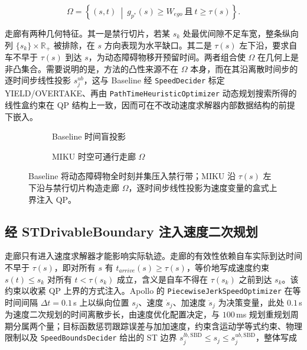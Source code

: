 \documentclass[a4paper,11pt]{ctexart}
\theoremstyle{definition}
\begin{document}
\begin{equation}
    \Omega = \left\{ (s,t) \ \middle|\ g_{p^{*}}(s) \geq W_{ego}\ \text{且}\ t \geq \tau(s) \right\}.
    \label{eq:st_corridor}
\end{equation}

走廊有两种几何特征。其一是禁行切片，若某 $s_k$ 处最优间隙不足车宽，整条纵向列 $\{s_k\}\times\mathbb{R}_{+}$ 被排除，在 $s$ 方向表现为水平缺口。其二是 $\tau(s)$ 左下沿，要求自车不早于 $\tau(s)$ 到达 $s$，为动态障碍物移开预留时间。两者组合使 $\Omega$ 在几何上是非凸集合。需要说明的是，方法的凸性来源不在 $\Omega$ 本身，而在其沿离散时间步的逐时间步线性投影 $s_j^{ub}$，这与 Baseline 经 \texttt{SpeedDecider} 标定 YIELD/OVERTAKE、再由 \texttt{PathTimeHeuristicOptimizer} 动态规划搜索所得的线性盒约束在 QP 结构上一致，因而可在不改动速度求解器内部数据结构的前提下嵌入。

\begin{figure}[htbp]
\centering
\begin{subfigure}[b]{0.46\textwidth}
  \centering
  \caption{Baseline 时间盲投影}
\end{subfigure}\hfill
\begin{subfigure}[b]{0.46\textwidth}
  \centering
  \caption{MIKU 时空可通行走廊 $\Omega$}
\end{subfigure}
\caption{ST 平面上的时空可通行走廊与上界收紧}
\caption*{Baseline 将动态障碍物全时刻并集压入禁行带；MIKU 沿 $\tau(s)$ 左下沿与禁行切片构造走廊 $\Omega$，逐时间步线性投影为速度变量的盒式上界注入 QP。}
\label{fig:corridor}
\end{figure}

\subsection{经 STDrivableBoundary 注入速度二次规划}
\label{sec:method_inject}

走廊只有进入速度求解器才能影响实际轨迹。走廊的有效性依赖自车实际到达时间不早于 $\tau(s)$，即对所有 $s$ 有 $t_{arrive}(s)\geq\tau(s)$，等价地写成速度约束 $s(t)\leq s_k$ 对所有 $t<\tau(s_k)$ 成立，含义是自车不得在 $\tau(s_k)$ 之前到达 $s_k$。该约束以收紧 QP 上界的方式注入。Apollo 的 \texttt{PiecewiseJerkSpeedOptimizer} 在等时间间隔 $\Delta t = 0.1$\,s 上以纵向位置 $s_j$、速度 $\dot{s}_j$、加速度 $\ddot{s}_j$ 为决策变量，此处 $0.1$\,s 为速度二次规划的时间离散步长，由速度优化配置决定，与 $100$\,ms 规划重规划周期分属两个量；目标函数惩罚跟踪误差与加加速度，约束含运动学等式约束、物理限制以及 \texttt{SpeedBoundsDecider} 给出的 ST 边界 $s_j^{lb,\mathrm{SBD}} \leq s_j \leq s_j^{ub,\mathrm{SBD}}$，整体写成
\end{document}
